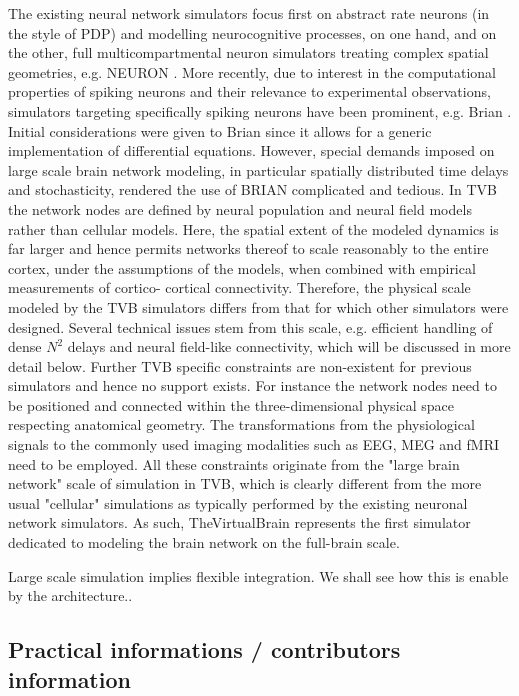 The existing neural network simulators focus first on abstract rate neurons (in
the style of PDP) and modelling neurocognitive processes, on one hand, and on
the other, full multicompartmental neuron simulators treating complex spatial
geometries, e.g. NEURON \cite{Hines_2001}.  More recently, due to interest in
the computational properties of spiking neurons and their relevance to
experimental observations, simulators targeting specifically spiking neurons
have been prominent, e.g. Brian \cite{Goodman_2009}. Initial considerations
were given to  Brian  since it allows for a generic
implementation of differential equations. However, special demands imposed on
large scale brain network modeling, in particular spatially distributed time
delays and stochasticity, rendered the use of BRIAN complicated and tedious.
In TVB the network nodes are defined by neural population and neural field
models \cite{Deco_2008a, Coombes_2010} rather than cellular models. Here, the
spatial extent of the modeled dynamics is far larger and hence permits networks
thereof to scale reasonably to the entire cortex, under the assumptions of the
models, when combined with empirical measurements of cortico- cortical
connectivity. Therefore, the physical scale modeled by the TVB simulators
differs from that for which other simulators were designed.  Several technical
issues stem from this scale, e.g. efficient handling of dense $N^2$ delays and
neural field-like connectivity, which will be discussed in more detail below.
Further TVB specific constraints are non-existent for previous simulators and
hence no support exists. For instance the network nodes need to be positioned
and connected within the three-dimensional physical space respecting anatomical
geometry. The transformations from the physiological signals to the commonly
used imaging modalities such as EEG, MEG and fMRI need to be employed. All
these constraints originate from the "large brain network" scale of simulation
in TVB, which is clearly different from the more usual "cellular" simulations
as typically performed by the existing neuronal network simulators. As such,
TheVirtualBrain represents the first simulator dedicated to modeling the brain
network on the full-brain scale. 

Large scale simulation implies flexible integration. We shall see
how this is enable by the architecture..

\subsection{Practical informations / contributors information}

